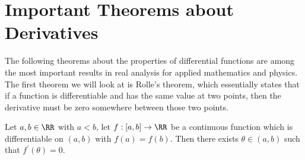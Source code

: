 \documentclass[../real_analysis.tex]{subfiles}
\begin{document}
    \section{Important Theorems about Derivatives}
        The following theorems about the properties of differential functions are among the most important results in real analysis for applied mathematics and physics. The first theorem we will look at is Rolle's theorem, which essentially states that if a function is differentiable and has the same value at two points, then the derivative must be zero somewhere between those two points.
        \begin{theorem}\label{rolles-thm}
            Let $a,b\in\RR$ with $a<b$, let $f:[a,b]\to\RR$ be a continuous function which is differentiable on $(a,b)$ with $f(a)=f(b)$. Then there exists $\theta\in(a,b)$ such that $f^\prime(\theta)=0$.
        \end{theorem}
\end{document}
